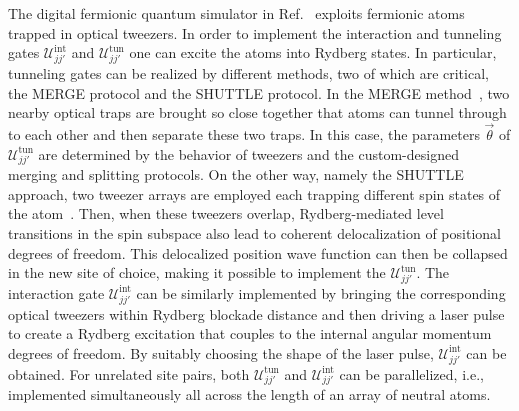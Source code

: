 \documentclass[aps, prx, reprint, superscriptaddress]{revtex4-2}
\begin{document}
The digital fermionic quantum simulator in Ref.~\cite{gonzalez2023fermionic} exploits fermionic atoms trapped in optical tweezers. 
In order to implement the interaction and tunneling gates $\mathcal{U}_{jj'}^{\text{int}}$ and $\mathcal{U}_{jj'}^{\text{tun}}$ one can excite the atoms into Rydberg states. In particular, tunneling gates can be realized by different methods, two of which are critical, the MERGE protocol and the SHUTTLE protocol.
In the MERGE method~\cite{kaufman2014two, spar2022realization,young2022tweezer}, two nearby optical traps are brought so close together that atoms can tunnel through to each other and then separate these two traps. 
In this case, the parameters $\vec{\theta}$ of $\mathcal{U}_{jj'}^{\text{tun}}$ are determined by the behavior of tweezers and the custom-designed merging and splitting protocols. 
On the other way, namely the SHUTTLE approach, two tweezer arrays are employed each trapping different spin states of the atom~\cite{daley2008quantum}. Then, when these tweezers overlap, Rydberg-mediated level transitions in the spin subspace also lead to coherent delocalization of positional degrees of freedom. This delocalized position wave function can then be collapsed in the new site of choice, making it possible to implement the $\mathcal{U}_{jj'}^{\text{tun}}$.
The interaction gate $\mathcal{U}^{\text{int}}_{jj'}$ can be similarly implemented by bringing the corresponding optical tweezers within Rydberg blockade distance and then driving a laser pulse to create a Rydberg excitation that couples to the internal angular momentum degrees of freedom. By suitably choosing the shape of the laser pulse,  $\mathcal{U}^{\text{int}}_{jj'}$ \cite{levine2019parallel} can be obtained.
For unrelated site pairs, both $\mathcal{U}^{\text{tun}}_{jj'}$ and $\mathcal{U}^{\text{int}}_{jj'}$ can be parallelized, i.e., implemented simultaneously all across the length of an array of neutral atoms. 


\end{document}
